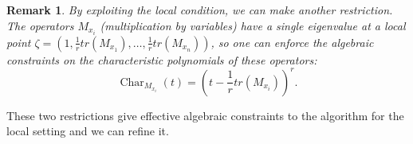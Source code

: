 \documentclass[a4paper,11p]{amsart}
\newtheorem{remark0}[defn0]{Remark}
\newenvironment{remark}{ \begin{remark0}\rm}{\end{remark0}}
\begin{document}
\begin{remark}\label{remark:local}    
By exploiting the local condition, we can make another  restriction. The operators $M_{x_i}$ (multiplication by variables) have a single eigenvalue at a local point  $\zeta=(1, \frac{1}{r}tr(M_{x_1}),\ldots,\frac{1}{r}tr(M_{x_n}))$, so one can enforce the algebraic constraints on the characteristic polynomials of these operators:
$$\operatorname{Char}_{M_{x_i}}(t)=\left(t-\frac{1}{r}tr(M_{x_i})\right)^r.$$
\end{remark}
These two restrictions give effective algebraic constraints to the algorithm for the local setting and we can refine it.
\end{document}
